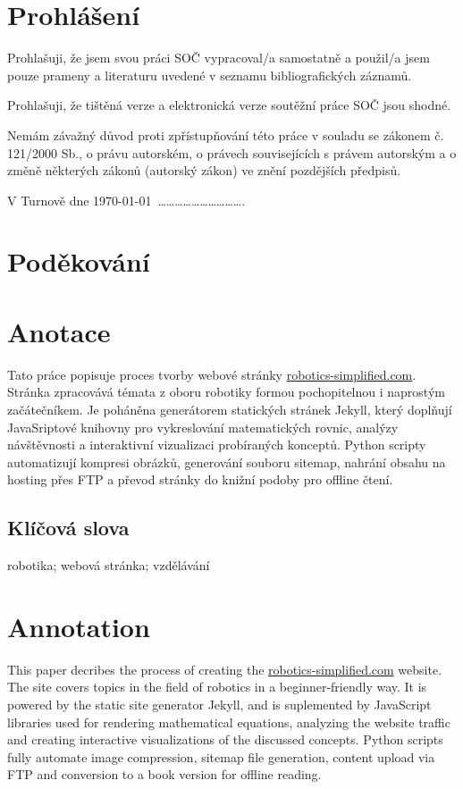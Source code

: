 \documentclass[a4paper, 12pt]{article}
\begin{document}
  \vspace{4em}

  \newpage

  \section*{\normalfont\textbf{Prohlášení}}
  Prohlašuji, že jsem svou práci SOČ vypracoval/a samostatně a použil/a jsem pouze prameny a literaturu uvedené v seznamu bibliografických záznamů.

  Prohlašuji, že tištěná verze a elektronická verze soutěžní práce SOČ jsou shodné.

  Nemám závažný důvod proti zpřístupňování této práce v souladu se zákonem č. 121/2000 Sb., o právu autorském, o právech souvisejících s právem autorským a o změně některých zákonů (autorský zákon) ve znění pozdějších předpisů.

  \qquad

  V Turnově dne \today \, ………………………….\\%

  \newpage

  \section*{\normalfont\textbf{Poděkování}}

  \newpage

  \section*{\normalfont\textbf{Anotace}}
  Tato práce popisuje proces tvorby webové stránky \url{robotics-simplified.com}. Stránka zpracovává témata z oboru robotiky formou pochopitelnou i naprostým začátečníkem. Je poháněna generátorem statických stránek Jekyll, který doplňují JavaSriptové knihovny pro vykreslování matematických rovnic, analýzy návštěvnosti a interaktivní vizualizaci probíraných konceptů. Python scripty automatizují kompresi obrázků, generování souboru sitemap, nahrání obsahu na hosting přes FTP a převod stránky do knižní podoby pro offline čtení.

  \subsection*{\fontsize{18}{21.6}\selectfont\normalfont\textbf{Klíčová slova}}
  robotika; webová stránka; vzdělávání

  \section*{\normalfont\textbf{Annotation}}
  This paper decribes the process of creating the \url{robotics-simplified.com} website. The site covers topics in the field of robotics in a beginner-friendly way. It is powered by the static site generator Jekyll, and is suplemented by JavaScript libraries used for rendering mathematical equations, analyzing the website traffic and creating interactive visualizations of the discussed concepts. Python scripts fully automate image compression, sitemap file generation, content upload via FTP and conversion to a book version for offline reading.
\end{document}
